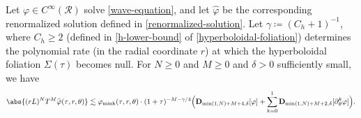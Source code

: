 \documentclass[10pt, reqno]{amsart}
\begin{document}
\begin{proposition}
Let \(\varphi{}\in C^\infty(\mathcal{R})\) solve \cref{wave-equation}, and let \(\widehat{\varphi{}}\) be
the corresponding renormalized solution defined in \cref{renormalized-solution}.
Let \(\gamma{}\coloneqq{}(C_h + 1)^{-1}\), where \(C_h\ge 2\) (defined in
\cref{h-lower-bound} of \cref{hyperboloidal-foliation}) determines the polynomial rate
(in the radial coordinate \(r\)) at which the hyperboloidal foliation
\(\Sigma{}(\tau{})\) becomes null. For \(N\ge 0\) and \(M\ge 0\) and \(\delta{}
> 0\) sufficiently small, we have
\begin{equation}\label{pointwise-decay-equation}
\abs{(rL)^NT^M\widehat{\varphi{}}(\tau{},r,\theta{})}\lesssim \varphi{}_{\textnormal{mink}}(\tau{},r,\theta{})\cdot (1+\tau{})^{-M-\gamma{}/4}\Bigl(\mathbf{D}_{\min (1,N)+M+4,\delta{}}[\varphi{}] + \sum_{k=0}^1\mathbf{D}_{\min (1,N)+M+2,\delta{}}[\partial{}_\theta^k\varphi{}]\Bigr).
\end{equation}
\label{pointwise-decay}
\end{proposition}
\end{document}
